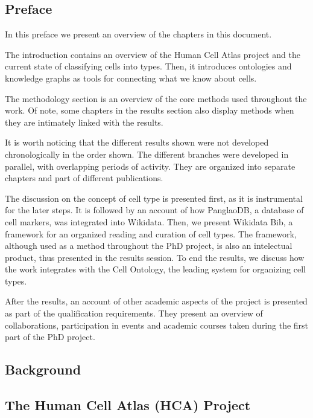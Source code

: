 \hypertarget{preface}{%
\subsection{Preface}\label{preface}}

In this preface we present an overview of the chapters in this document.

The introduction contains an overview of the Human Cell Atlas project and the current state of classifying cells into types.
Then, it introduces ontologies and knowledge graphs as tools for connecting what we know about cells.

The methodology section is an overview of the core methods used throughout the work.
Of note, some chapters in the results section also display methods when they are intimately linked with the results.

It is worth noticing that the different results shown were not developed chronologically in the order shown.
The different branches were developed in parallel, with overlapping periods of activity.
They are organized into separate chapters and part of different publications.

The discussion on the concept of cell type is presented first, as it is instrumental for the later steps.
It is followed by an account of how PanglaoDB, a database of cell markers, was integrated into Wikidata.
Then, we present Wikidata Bib, a framework for an organized reading and curation of cell types.
The framework, although used as a method throughout the PhD project, is also an intelectual product, thus presented in the results session.
To end the results, we discuss how the work integrates with the Cell Ontology, the leading system for organizing cell types.

After the results, an account of other academic aspects of the project is presented as part of the qualification requirements.
They present an overview of collaborations, participation in events and academic courses taken during the first part of the PhD project.

\hypertarget{background}{%
\subsection{Background}\label{background}}

\hypertarget{the-human-cell-atlas-hca-project}{%
\subsection{The Human Cell Atlas (HCA) Project}\label{the-human-cell-atlas-hca-project}}

